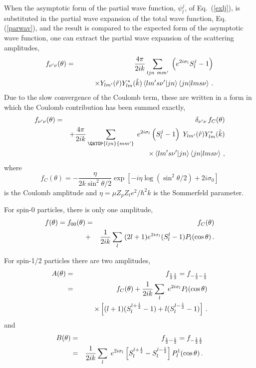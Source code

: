 When the asymptotic form of the partial wave function, $\psi_{l}^{j}$, of
Eq.~(\ref{exlj}), is substituted in the partial wave expansion of the total
wave function, Eq. (\ref{parwav}), and the result is compared to the
expected form of the asymptotic wave function, one can extract the partial
wave expansion of the scattering amplitudes,
\begin{eqnarray}
f_{\nu^{\prime}\nu}(\theta) &=& \frac{4\pi}{2ik}\sum_{{{{ljn}{\ mm^{\prime}}}%
}}\;\left(e^{2i\sigma_{l}}S_{l}^{j}-1\right) \\
&& \qquad\times Y_{lm^{\prime}}(\hat{r})Y_{lm}^{*}(\hat{k})\left\langle
lm^{\prime}s\nu^{\prime}|jn\right\rangle \left\langle jn|lms\nu\right\rangle
\,.  \notag
\end{eqnarray}
Due to the slow convergence of the Coulomb term, these are written in a form
in which the Coulomb contribution has been summed exactly,%
\begin{eqnarray}
f_{\nu^{\prime}\nu}(\theta) & = & \delta_{\nu^{\prime}\nu}\, f_{C}(\theta) \\
& & +\frac{4\pi}{2ik}\sum_{{{\QATOP{ljn}{mm^{\prime}}}}}\;
e^{2i\sigma_{l}}\left(S_{l}^{j}-1\right)\; Y_{lm^{\prime}}(\hat{r}%
)Y_{lm}^{*}(\hat{k})  \notag \\
& & \qquad\qquad\times\left\langle lm^{\prime}s\nu^{\prime}|jn\right\rangle
\left\langle jn|lms\nu\right\rangle \,,  \notag
\end{eqnarray}
where
\begin{equation}
f_{C}(\theta)=-\frac{\eta}{2k\sin^{2}\theta/2}\exp\left[-i\eta\log\left(%
\sin^{2}\theta/2\right)+2i\sigma_{0}\right]
\end{equation}
is the Coulomb amplitude and $\eta=\mu Z_p Z_t e^2/\hbar^2 k $ is the
Sommerfeld parameter.

For spin-0 particles, there is only one amplitude,
\begin{eqnarray}
f(\theta)=f_{00}(\theta) & = & f_{C}(\theta) \\
& + & \frac{1}{2ik}\sum_{l}\;(2l+1)e^{2i\sigma_{l}}(S_{l}^{l}-1)P_{l}(\cos%
\theta)\,.  \notag
\end{eqnarray}

For spin-1/2 particles there are two amplitudes,
\begin{eqnarray}
A(\theta) & = & f_{\frac{1}{2}\frac{1}{2}}=f_{-\frac{1}{2}-\frac{1}{2}} \\
& = & f_{C}(\theta)+\frac{1}{2ik}\sum_{l}\; e^{2i\sigma_{l}}P_{l}(\cos\theta)
\notag \\
& & \qquad\times\left[(l+1)(S_{l}^{l+\frac{1}{2}}-1)+l(S_{l}^{l-\frac{1}{2}%
}-1)\right]\,.  \notag
\end{eqnarray}
and
\begin{eqnarray}
B(\theta) & = & f_{\frac{1}{2}-\frac{1}{2}}=f_{-\frac{1}{2}\frac{1}{2}} \\
& = & \frac{1}{2ik}\sum_{l}\; e^{2i\sigma_{l}}\left[S_{l}^{l+\frac{1}{2}%
}-S_{l}^{l-\frac{1}{2}}\right]P_{l}^{1}(\cos\theta)\,.  \notag
\end{eqnarray}

